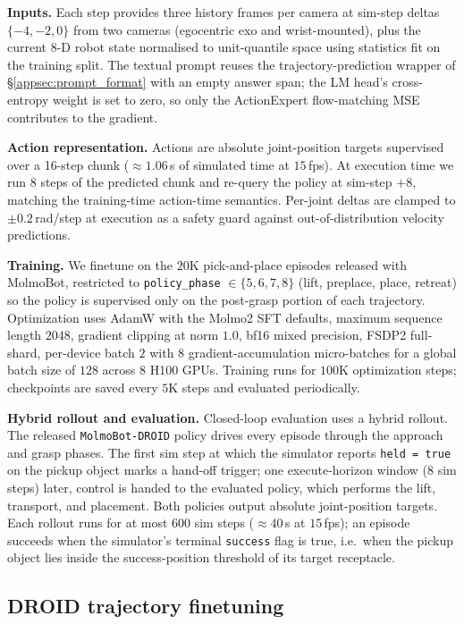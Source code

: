 \documentclass{llmxive}
\begin{document}
\noindent\textbf{Inputs.}
Each step provides three history frames per camera at sim-step deltas
$\{-4, -2, 0\}$ from two cameras (egocentric exo and wrist-mounted), plus the
current 8-D robot state normalised to unit-quantile space using statistics
fit on the training split. The textual prompt reuses the
trajectory-prediction wrapper of \S\ref{appsec:prompt_format} with an empty
answer span; the LM head's cross-entropy weight is set to zero, so only the
ActionExpert flow-matching MSE contributes to the gradient.

\noindent\textbf{Action representation.}
Actions are absolute joint-position targets supervised over a 16-step chunk
($\approx 1.06$\,s of simulated time at $15$\,fps). At execution time we run
$8$ steps of the predicted chunk and re-query the policy at sim-step $+8$,
matching the training-time action-time semantics. Per-joint deltas are
clamped to $\pm 0.2$\,rad/step at execution as a safety guard against
out-of-distribution velocity predictions.

\noindent\textbf{Training.}
We finetune on the $20$K pick-and-place episodes released with MolmoBot,
restricted to \texttt{policy\_phase} $\in \{5, 6, 7, 8\}$ (lift, preplace,
place, retreat) so the policy is supervised only on the post-grasp portion of
each trajectory. Optimization uses AdamW with the Molmo2 SFT defaults,
maximum sequence length $2048$, gradient clipping at norm $1.0$, bf16
mixed precision, FSDP2 full-shard, per-device batch $2$ with $8$
gradient-accumulation micro-batches for a global batch size of $128$ across
$8$ H100 GPUs. Training runs for $100$K optimization steps; checkpoints are
saved every $5$K steps and evaluated periodically.

\noindent\textbf{Hybrid rollout and evaluation.}
Closed-loop evaluation uses a hybrid rollout. The released
\texttt{MolmoBot-DROID} policy drives every episode through the approach and
grasp phases. The first sim step at which the simulator reports
\texttt{held = true} on the pickup object marks a hand-off trigger; one
execute-horizon window ($8$ sim steps) later, control is handed to the
evaluated policy, which performs the lift, transport, and placement. Both
policies output absolute joint-position targets. Each rollout runs for at most
$600$ sim steps ($\approx 40$\,s at $15$\,fps); an episode succeeds when the
simulator's terminal \texttt{success} flag is true, i.e.\ when the pickup
object lies inside the success-position threshold of its target receptacle.

\subsection{DROID trajectory finetuning}
\label{appsec:droid}
\end{document}
